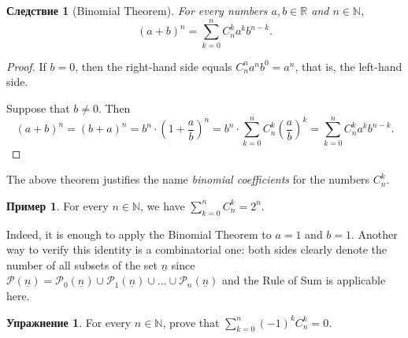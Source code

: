 \documentclass[12pt,notitlepage]{article}
\theoremstyle{plain}
\newtheorem{corr}[thm]{Следствие}
\theoremstyle{definition}
\newtheorem{exc}[thm]{Упражнение}
\newtheorem{exm}[thm]{Пример}
\theoremstyle{plain}
\newcommand{\N}{\mathbb{N}}
\newcommand{\R}{\mathbb{R}}
\newcommand{\mP}{\mathcal{P}}
\newcommand{\ul}[1]{\underline{#1}}
\newcommand{\1}{\mathbf{1}}
\newcommand{\0}{\mathbf{0}}
\begin{document}
\begin{corr}[Binomial Theorem]
	For every numbers $a, b \in \R$ and $n \in \N$,
	$$(a + b)^n = \sum_{k = 0}^n C_n^k a^k b^{n-k}.$$
\end{corr}
\begin{proof}
	If $b = 0$, then the right-hand side equals $C_n^n a^n b^0 = a^n$, that is, the left-hand side.
	
	Suppose that $b \neq 0$. Then
	$$(a + b)^n = (b + a)^n = b^n \cdot \left (1 + \dfrac{a}{b} \right)^n = b^n \cdot \sum_{k = 0}^n C_n^k \left ( \dfrac{a}{b} \right)^k = \sum_{k = 0}^n C_n^k a^k b^{n-k}.$$
\end{proof}
\noindent The above theorem justifies the name \emph{binomial coefficients} for the numbers $C_n^k$.

\begin{exm}\label{L11:pow_2}
	For every $n \in \N$, we have $\sum_{k = 0}^n C_n^k = 2^n$.
	
	Indeed, it is enough to apply the Binomial Theorem to $a = 1$ and $b = 1$. Another way to verify this identity is a combinatorial one: both sides clearly denote the number of all subsets of the set $\ul{n}$ since $\mP(\ul{n}) = \mP_0(\ul{n}) \cup \mP_1(\ul{n}) \cup \ldots \cup \mP_n(\ul{n})$ and the Rule of Sum is applicable here.
\end{exm}

\begin{exc}
	For every $n \in \N$, prove that $\sum_{k = 0}^n (-1)^k C_n^k = 0$.
\end{exc}
\end{document}
